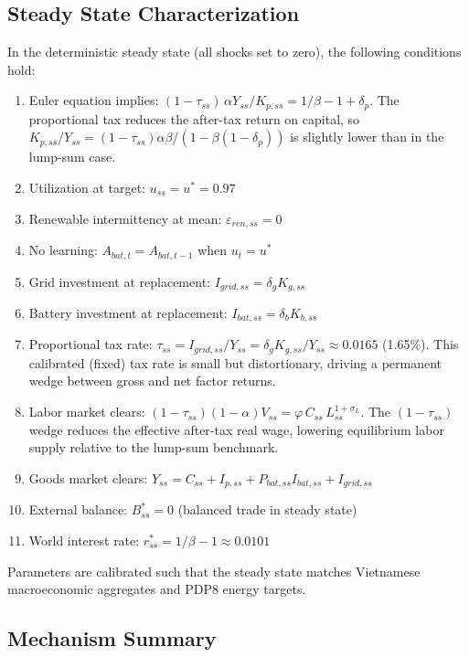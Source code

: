 \documentclass[12pt, a4paper]{article}
\begin{document}
\subsection{Steady State Characterization}

In the deterministic steady state (all shocks set to zero), the following conditions hold:

\begin{enumerate}
    \item Euler equation implies: $(1-\tau_{ss})\,\alpha Y_{ss}/K_{p,ss} = 1/\beta - 1 + \delta_p$. The proportional tax reduces the after-tax return on capital, so $K_{p,ss}/Y_{ss} = (1-\tau_{ss})\alpha\beta/(1-\beta(1-\delta_p))$ is slightly lower than in the lump-sum case.
    \item Utilization at target: $u_{ss} = u^* = 0.97$
    \item Renewable intermittency at mean: $\varepsilon_{ren,ss} = 0$
    \item No learning: $A_{bat,t} = A_{bat,t-1}$ when $u_t = u^*$
    \item Grid investment at replacement: $I_{grid,ss} = \delta_g K_{g,ss}$
    \item Battery investment at replacement: $I_{bat,ss} = \delta_b K_{b,ss}$
    \item Proportional tax rate: $\tau_{ss} = I_{grid,ss}/Y_{ss} = \delta_g K_{g,ss}/Y_{ss} \approx 0.0165$ (1.65\%). This calibrated (fixed) tax rate is small but distortionary, driving a permanent wedge between gross and net factor returns.
    \item Labor market clears: $(1-\tau_{ss})(1-\alpha)V_{ss} = \varphi \, C_{ss} \, L_{ss}^{1+\sigma_L}$. The $(1-\tau_{ss})$ wedge reduces the effective after-tax real wage, lowering equilibrium labor supply relative to the lump-sum benchmark.
    \item Goods market clears: $Y_{ss} = C_{ss} + I_{p,ss} + P_{bat,ss} I_{bat,ss} + I_{grid,ss}$
    \item External balance: $B^*_{ss} = 0$ (balanced trade in steady state)
    \item World interest rate: $r^*_{ss} = 1/\beta - 1 \approx 0.0101$
\end{enumerate}

Parameters are calibrated such that the steady state matches Vietnamese macroeconomic aggregates and PDP8 energy targets.

\subsection{Mechanism Summary}
\end{document}
